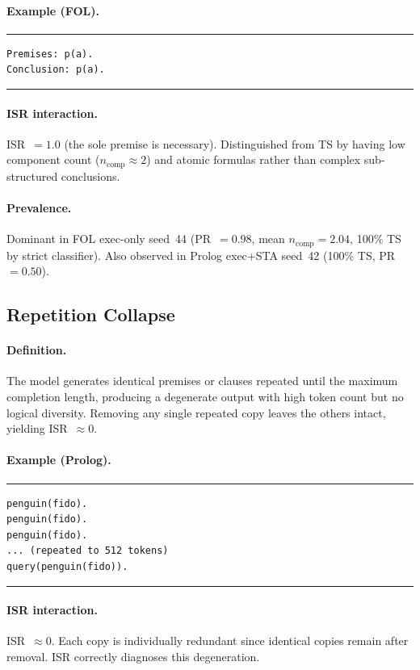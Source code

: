 \paragraph{Example (FOL).}
\smallskip\noindent\rule{\columnwidth}{0.3pt}
\begin{verbatim}
Premises: p(a).
Conclusion: p(a).
\end{verbatim}
\noindent\rule{\columnwidth}{0.3pt}\smallskip

\paragraph{ISR interaction.}
ISR~$=1.0$ (the sole premise is necessary).
Distinguished from TS by having low component count ($n_{\text{comp}}\approx 2$) and atomic formulas rather than complex sub-structured conclusions.

\paragraph{Prevalence.}
Dominant in FOL exec-only seed~44 (PR~$=0.98$, mean $n_{\text{comp}}=2.04$, 100\% TS by strict classifier).
Also observed in Prolog exec+STA seed~42 (100\% TS, PR~$=0.50$).


\subsection{Repetition Collapse}

\paragraph{Definition.}
The model generates identical premises or clauses repeated until the maximum completion length, producing a degenerate output with high token count but no logical diversity.
Removing any single repeated copy leaves the others intact, yielding ISR~$\approx 0$.

\paragraph{Example (Prolog).}
\smallskip\noindent\rule{\columnwidth}{0.3pt}
\begin{verbatim}
penguin(fido).
penguin(fido).
penguin(fido).
... (repeated to 512 tokens)
query(penguin(fido)).
\end{verbatim}
\noindent\rule{\columnwidth}{0.3pt}\smallskip

\paragraph{ISR interaction.}
ISR~$\approx 0$. Each copy is individually redundant since identical copies remain after removal.
ISR correctly diagnoses this degeneration.

